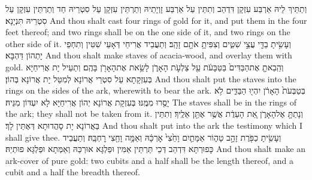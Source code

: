 {וְתַתֵּיךְ לֵיהּ אַרְבַּע עִזְקָן דִּדְהַב וְתִתֵּין עַל אַרְבַּע זָוְיָתֵיהּ וְתַרְתֵּין עִזְקָן עַל סִטְרֵיהּ חַד וְתַרְתֵּין עִזְקָן עַל סִטְרֵיהּ תִּנְיָנָא׃}
{And thou shalt cast four rings of gold for it, and put them in the four feet thereof; and two rings shall be on the one side of it, and two rings on the other side of it.}{}
{וְעָשִׂ֥יתָ בַדֵּ֖י עֲצֵ֣י שִׁטִּ֑ים וְצִפִּיתָ֥ אֹתָ֖ם זָהָֽב׃}
{וְתַעֲבֵיד אֲרִיחֵי דְּאָעֵי שִׁטִּין וְתִחְפֵי יָתְהוֹן דַּהְבָּא׃}
{And thou shalt make staves of acacia-wood, and overlay them with gold.}{}
{וְהֵֽבֵאתָ֤ אֶת\maqqaf הַבַּדִּים֙ בַּטַּבָּעֹ֔ת עַ֖ל צַלְעֹ֣ת הָאָרֹ֑ן לָשֵׂ֥את אֶת\maqqaf הָאָרֹ֖ן בָּהֶֽם׃}
{וְתַעֵיל יָת אֲרִיחַיָּא בְּעִזְקָתָא עַל סִטְרֵי אֲרוֹנָא לְמִטַּל יָת אֲרוֹנָא בְּהוֹן׃}
{And thou shalt put the staves into the rings on the sides of the ark, wherewith to bear the ark.}{}
{בְּטַבְּעֹת֙ הָאָרֹ֔ן יִהְי֖וּ הַבַּדִּ֑ים לֹ֥א יָסֻ֖רוּ מִמֶּֽנּוּ׃}
{בְּעִזְקָת אֲרוֹנָא יְהוֹן אֲרִיחַיָּא לָא יִעְדּוֹן מִנֵּיהּ׃}
{The staves shall be in the rings of the ark; they shall not be taken from it.}{}
{וְנָתַתָּ֖ אֶל\maqqaf הָאָרֹ֑ן אֵ֚ת הָעֵדֻ֔ת אֲשֶׁ֥ר אֶתֵּ֖ן אֵלֶֽיךָ׃}
{וְתִתֵּין בַּאֲרוֹנָא יָת סָהֲדוּתָא דְּאֶתֵּין לָךְ׃}
{And thou shalt put into the ark the testimony which I shall give thee.}{}
{וְעָשִׂ֥יתָ כַפֹּ֖רֶת זָהָ֣ב טָה֑וֹר אַמָּתַ֤יִם וָחֵ֙צִי֙ אׇרְכָּ֔הּ וְאַמָּ֥ה וָחֵ֖צִי רׇחְבָּֽהּ׃}
{וְתַעֲבֵיד כָּפוּרְתָּא דִּדְהַב דְּכֵי תַּרְתֵּין אַמִּין וּפַלְגָּא אוּרְכַּהּ וְאַמְּתָא וּפַלְגָּא פוּתְיַהּ׃}
{And thou shalt make an ark-cover of pure gold: two cubits and a half shall be the length thereof, and a cubit and a half the breadth thereof.}{}
